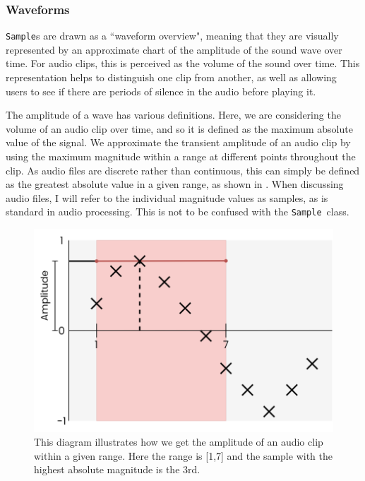 \documentclass[12pt,a4paper,oneside,openright]{report}
\newcommand{\sample}{\texttt{Sample}}
\begin{document}
\subsubsection{Waveforms}
\sample s are drawn as a ``waveform overview", meaning that they are visually represented by an approximate chart of the amplitude of the sound wave over time. For audio clips, this is perceived as the volume of the sound over time. This representation helps to distinguish one clip from another, as well as allowing users to see if there are periods of silence in the audio before playing it.

The amplitude of a wave has various definitions. Here, we are considering the volume of an audio clip over time, and so it is defined as the maximum absolute value of the signal. We approximate the transient amplitude of an audio clip by using the maximum magnitude within a range at different points throughout the clip. As audio files are discrete rather than continuous, this can simply be defined as the greatest absolute value in a given range, as shown in . When discussing audio files, I will refer to the individual magnitude values as samples, as is standard in audio processing. This is not to be confused with the \sample\ class.

\begin{figure}[h]
    \centering
    \includegraphics[scale=0.3]{images/amplitude_example.png}
    \caption{This diagram illustrates how we get the amplitude of an audio clip within a given range. Here the range is [1,7] and the sample with the highest absolute magnitude is the 3rd.}
    \label{fig:amplitude}
\end{figure}
\end{document}
